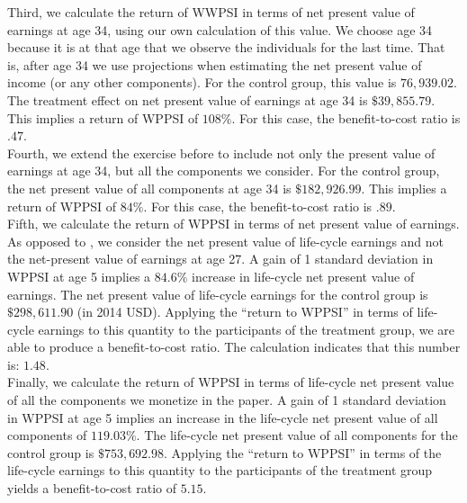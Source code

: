 \noindent Third, we calculate the return of WWPSI in terms of net present value of earnings at age 34, using our own calculation of this value. We choose age 34 because it is at that age that we observe the individuals for the last time. That is, after age 34 we use projections when estimating the net present value of income (or any other components). For the control group, this value is $76,939.02$. The treatment effect on net present value of earnings at age 34 is $\$39,855.79$. This implies a return of WPPSI of $108\%$. For this case, the benefit-to-cost ratio is $.47$.\\

\noindent Fourth, we extend the exercise before to include not only the present value of earnings at age 34, but all the components we consider. For the control group, the net present value of all components at age 34 is $\$182,926.99$. This implies a return of WPPSI of $84\%$. For this case, the benefit-to-cost ratio is $.89$.\\

\noindent Fifth, we calculate the return of WPPSI in terms of net present value of earnings. As opposed to \citet{Chetty_Friedman_etal_2010_HowDoesYour}, we consider the net present value of life-cycle earnings and not the net-present value of earnings at age 27. A gain of 1 standard deviation in WPPSI at age 5 implies a $84.6\%$ increase in life-cycle net present value of earnings. The net present value of life-cycle earnings for the control group is $\$298,611.90$ (in 2014 USD). Applying the ``return to WPPSI'' in terms of life-cycle earnings to this quantity to the participants of the treatment group, we are able to produce a benefit-to-cost ratio. The calculation indicates that this number is: $1.48$.\\

\noindent Finally, we calculate the return of WPPSI in terms of life-cycle net present value of all the components we monetize in the paper. A gain of 1 standard deviation in WPPSI at age 5 implies an increase in the life-cycle net present value of all components of $119.03\%$. The life-cycle net present value of all components for the control group is $\$753,692.98$. Applying the ``return to WPPSI'' in terms of the life-cycle earnings to this quantity to the participants of the treatment group yields a benefit-to-cost ratio of $5.15$.\\

\singlespace



